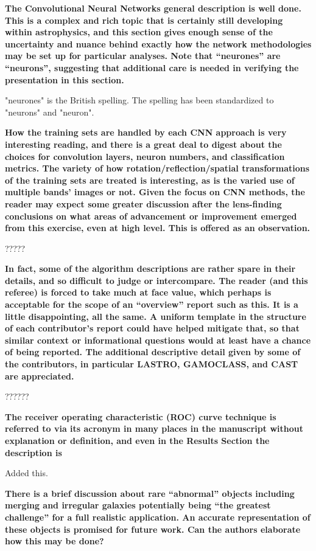 \documentclass[11pt,a4paper]{article}
\begin{document}
{\bf
The Convolutional Neural Networks general description is well done.  This is a complex and rich topic that is certainly still developing within astrophysics, and this section gives enough sense of the uncertainty and nuance behind exactly how the network methodologies may be set up for particular analyses.  Note that “neurones” are “neurons”, suggesting that additional care is needed in verifying the presentation in this section.   
}

"neurones" is the British spelling.  The spelling has been standardized to "neurons" and "neuron".

{\bf
How the training sets are handled by each CNN approach is very interesting reading, and there is a great deal to digest about the choices for convolution layers, neuron numbers, and classification metrics.  The variety of how rotation/reflection/spatial transformations of the training sets are treated is interesting, as is the varied use of multiple bands’ images or not.  Given the focus on CNN methods, the reader may expect some greater discussion after the lens-finding conclusions on what areas of advancement or improvement emerged from this exercise, even at high level.   This is offered as an observation.  
}

?????

{\bf
In fact, some of the algorithm descriptions are rather spare in their details, and so difficult to judge or intercompare.  The reader (and this referee) is forced to take much at face value, which perhaps is acceptable for the scope of an “overview” report such as this.  It is a little disappointing, all the same.  A uniform template in the structure of each contributor’s report could have helped mitigate that, so that similar context or informational questions would at least have a chance of being reported.  The additional descriptive detail given by some of the contributors, in particular LASTRO, GAMOCLASS, and CAST are appreciated. 
}

??????

{\bf
The receiver operating characteristic (ROC) curve technique is referred to via its acronym in many places in the manuscript without explanation or definition, and even in the Results Section the description is 
}

Added this.

{\bf
There is a brief discussion about rare “abnormal” objects including merging and irregular galaxies potentially being “the greatest challenge” for a full realistic application. 
An accurate representation of these objects is promised for future work. Can the authors elaborate how this may be done? 
}
\end{document}
